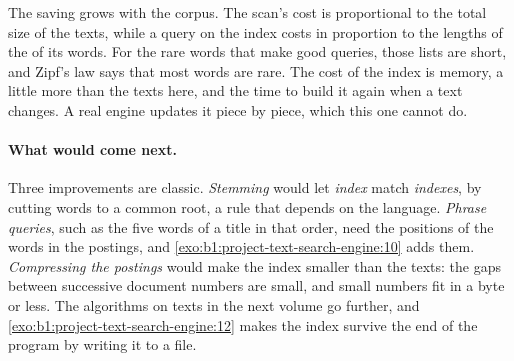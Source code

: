 \begin{omfigure}
\par{}
\end{omfigure}

The saving grows with the corpus. The scan's cost is proportional to the total size of the texts, while a query on the
index costs in proportion to the lengths of the  of its words. For the rare words that make good queries,
those lists are short, and Zipf's law says that most words are rare. The cost of the index is memory, a little more than
the texts here, and the time to build it again when a text changes. A real engine updates it piece by piece, which
this one cannot do.

\paragraph{What would come next.} Three improvements are classic. \emph{Stemming} would let \emph{index} match
\emph{indexes}, by cutting words to a common root, a rule that depends on the language. \emph{Phrase queries}, such as
the five words of a title in that order, need the positions of the words in the postings, and
\cref{exo:b1:project-text-search-engine:10} adds them. \emph{Compressing the postings} would make the index smaller
than the texts: the gaps between successive document numbers are small, and small numbers fit in a byte or less. The
algorithms on texts in the next volume go further, and \cref{exo:b1:project-text-search-engine:12} makes the index
survive the end of the program by writing it to a file.

